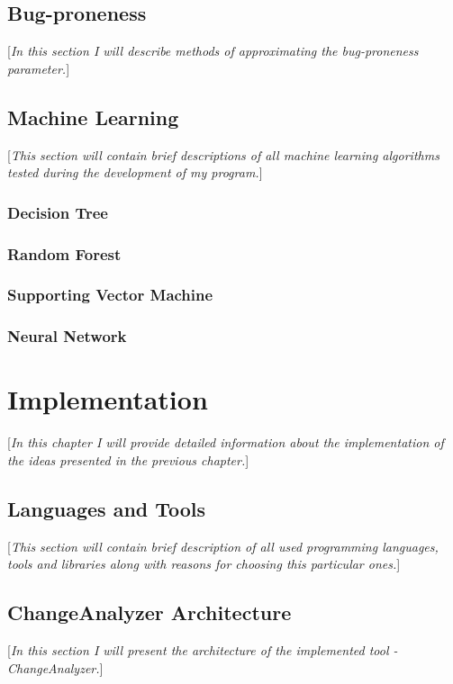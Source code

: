 \documentclass{pracamgr}
\begin{document}
\section{Bug-proneness}
[\textit{In this section I will describe methods of approximating the bug-proneness parameter.}]

\section{Machine Learning}
[\textit{This section will contain brief descriptions of all machine learning algorithms tested during the development of my program.}]

\subsection{Decision Tree}

\subsection{Random Forest}

\subsection{Supporting Vector Machine}

\subsection{Neural Network}

\chapter{Implementation}
[\textit{In this chapter I will provide detailed information about the implementation of the ideas presented in the previous chapter.}]

\section{Languages and Tools}
[\textit{This section will contain brief description of all used programming languages, tools and libraries along with reasons for choosing this particular ones.}]

\section{ChangeAnalyzer Architecture}
[\textit{In this section I will present the architecture of the implemented tool - ChangeAnalyzer.}]
\end{document}
